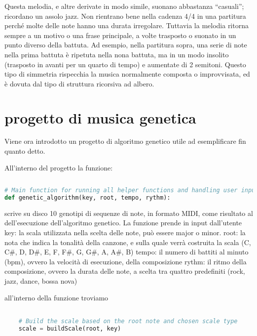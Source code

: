 \documentclass[a4paper,12pt]{report}
\begin{document}
Questa melodia, e altre derivate in modo simile, suonano abbastanza “casuali”; ricordano un assolo jazz. 
Non rientrano bene nella cadenza 4/4 in una partitura perché molte delle note hanno una durata irregolare. 
Tuttavia la melodia ritorna sempre a un motivo o una frase principale, 
a volte trasposto o suonato in un punto diverso della battuta. 
Ad esempio, nella partitura sopra, una serie di note nella prima battuta è ripetuta nella nona battuta, ma in un modo insolito (trasposto in avanti per un quarto di tempo) e aumentate di 2 semitoni. 
Questo tipo di simmetria rispecchia la musica normalmente composta o improvvisata, ed è dovuta dal tipo di struttura ricorsiva ad albero.

\chapter{progetto di musica genetica}

Viene ora introdotto un progetto di algoritmo genetico utile ad esemplificare fin quanto detto.

All'interno del progetto la funzione:

\begin{lstlisting}[language=Python]
 
# Main function for running all helper functions and handling user input.
def genetic_algorithm(key, root, tempo, rythm):

\end{lstlisting}

scrive su disco 10 genotipi di sequenze di note, in formato MIDI, come risultato al dell'esecuzione dell'algoritmo genetico.
La funzione prende in input dall'utente
key: la scala utilizzata nella scelta delle note, può essere major o minor.
root: la nota che indica la tonalità della canzone, e sulla quale verrà costruita la scala (C, C#, D, D#, E, F, F#, G, G#, A, A#, B)
tempo: il numero di battiti al minuto (bpm), ovvero la velocità di esecuzione, della composizione
rythm: il ritmo della composizione, ovvero la durata delle note, a scelta tra quattro predefiniti (rock, jazz, dance, bossa nova)

all'interno della funzione troviamo

\begin{lstlisting}[language=Python]

    # Build the scale based on the root note and chosen scale type
    scale = buildScale(root, key)

\end{lstlisting}
\end{document}
